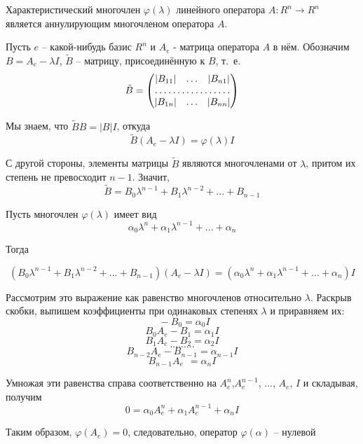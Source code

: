 \begin{teorema}
Характеристический многочлен $\varphi(\lambda)$ линейного оператора $A:R^n\to R^n$ является аннулирующим многочленом оператора $A$.
\end{teorema}

\dokvo
Пусть $e$ -- какой-нибудь базис $R^n$ и $A_e$ - матрица оператора $A$ в нём.
Обозначим $B=A_e-\lambda I$, $\tilde{B}$ -- матрицу, присоединённую к $B$, т.~е.
$$
\tilde{B}=\begin{pmatrix}
|B_{11}| & \hdots & |B_{n1}| \\
\hdotsfor{3}\\
|B_{1n}| & \hdots & |B_{nn}| 
\end{pmatrix}
$$

Мы знаем, что $\tilde{B} B = |B|I$, откуда
$$
\tilde{B}(A_e-\lambda I)=\varphi(\lambda) I
$$

С другой стороны, элементы матрицы $\tilde{B}$ являются многочленами от $\lambda$, притом их степень не превосходит $n-1$. Значит,
$$
\tilde{B}=B_0\lambda^{n-1}+B_1\lambda^{n-2}+...+B_{n-1}
$$

Пусть многочлен $\varphi(\lambda)$ имеет вид
$$
\alpha_0 \lambda^n+\alpha_1 \lambda^{n-1}+...+\alpha_n
$$

Тогда

$$
(B_0\lambda^{n-1}+B_1\lambda^{n-2}+...+B_{n-1})(A_e-\lambda I)=(\alpha_0 \lambda^n+\alpha_1 \lambda^{n-1}+...+\alpha_n)I
$$

Рассмотрим это выражение как равенство многочленов относительно $\lambda$. Раскрыв скобки, выпишем коэффициенты при одинаковых степенях $\lambda$ и приравняем их:
$$~~-B_0=\alpha_0 I$$
$$B_0 A_e-B_1 = \alpha_1 I$$
$$B_1 A_e-B_2 = \alpha_2 I$$
$$.........$$
$$B_{n-2} A_e-B_{n-1} = \alpha_{n-1} I$$
$$B_{n-1} A_e~~ = \alpha_{n} I$$

Умножая эти равенства справа соответственно на $A_e^{n}$,$A_e^{n-1}$, ..., $A_e$, $I$ и складывая, получим
$$
0=\alpha_0 A_e^{n}+\alpha_1 A_e^{n-1}+\alpha_n I
$$

Таким образом, $\varphi(A_e)=0$, следовательно, оператор $\varphi(\alpha)$ -- нулевой


